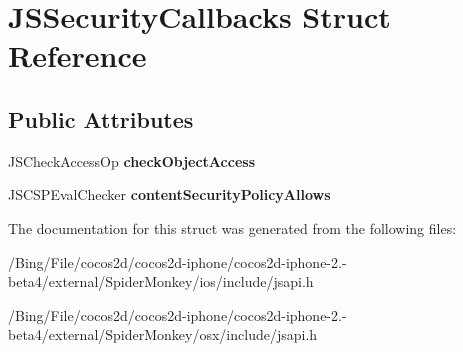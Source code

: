 \hypertarget{struct_j_s_security_callbacks}{\section{J\-S\-Security\-Callbacks Struct Reference}
\label{struct_j_s_security_callbacks}
}
\subsection*{Public Attributes}
\begin{DoxyCompactItemize}
\item 
\hypertarget{struct_j_s_security_callbacks_a8d9e025f55a30cf0ee15df5f39f02356}{J\-S\-Check\-Access\-Op {\bfseries check\-Object\-Access}}\label{struct_j_s_security_callbacks_a8d9e025f55a30cf0ee15df5f39f02356}

\item 
\hypertarget{struct_j_s_security_callbacks_a8e4cf7d68eece8342fd46a77b89c3255}{J\-S\-C\-S\-P\-Eval\-Checker {\bfseries content\-Security\-Policy\-Allows}}\label{struct_j_s_security_callbacks_a8e4cf7d68eece8342fd46a77b89c3255}

\end{DoxyCompactItemize}


The documentation for this struct was generated from the following files\-:\begin{DoxyCompactItemize}
\item 
/\-Bing/\-File/cocos2d/cocos2d-\/iphone/cocos2d-\/iphone-\/2.-\/beta4/external/\-Spider\-Monkey/ios/include/jsapi.\-h\item 
/\-Bing/\-File/cocos2d/cocos2d-\/iphone/cocos2d-\/iphone-\/2.-\/beta4/external/\-Spider\-Monkey/osx/include/jsapi.\-h\end{DoxyCompactItemize}
